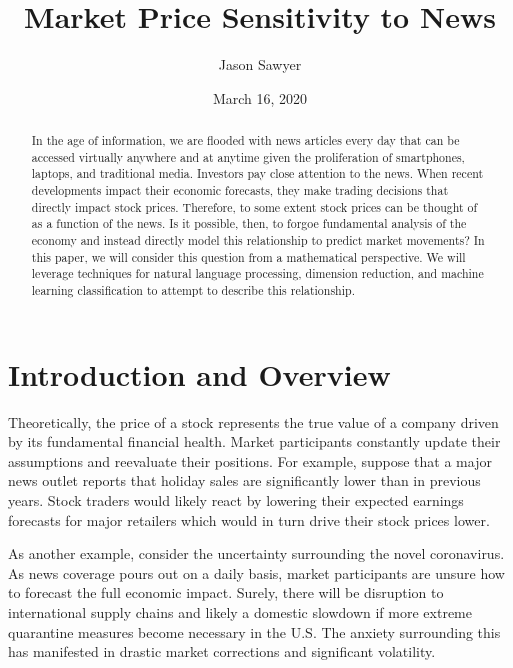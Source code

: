 \documentclass{article}
\title{Market Price Sensitivity to News}
\author{Jason Sawyer}
\date{March 16, 2020}
\begin{document}
\maketitle

\begin{abstract}
In the age of information, we are flooded with news articles every day that can be accessed virtually anywhere and at anytime given the proliferation of smartphones, laptops, and traditional media.  Investors pay close attention to the news.  When recent developments impact their economic forecasts, they make trading decisions that directly impact stock prices.  Therefore, to some extent stock prices can be thought of as a function of the news.  Is it possible, then, to forgoe fundamental analysis of the economy and instead directly model this relationship to predict market movements?  In this paper, we will consider this question from a mathematical perspective.  We will leverage techniques for natural language processing, dimension reduction, and machine learning classification to attempt to describe this relationship.
 \\
\begin{center}
\href{https://github.com/sawy0056/AMATH582/tree/master/FinalProject}{\color{blue}{https://github.com/sawy0056/AMATH582/tree/master/FinalProject}}
\end{center}
\end{abstract}

\section{Introduction and Overview}
Theoretically, the price of a stock represents the true value of a company driven by its fundamental financial health.  Market participants constantly update their assumptions and reevaluate their positions.  For example, suppose that a major news outlet reports that holiday sales are significantly lower than in previous years.  Stock traders would likely react by lowering their expected earnings forecasts for major retailers which would in turn drive their stock prices lower.  

As another example, consider the uncertainty surrounding the novel coronavirus.  As news coverage pours out on a daily basis, market participants are unsure how to forecast the full economic impact.  Surely, there will be disruption to international supply chains and likely a domestic slowdown if more extreme quarantine measures become necessary in the U.S.  The anxiety surrounding this has manifested in drastic market corrections and significant volatility. 
\end{document}

